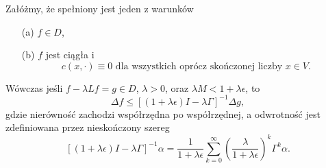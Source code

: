 \documentclass{article}
\begin{document}
	\begin{fak}\label{fak:4.2}
		Załóżmy, że spełniony jest jeden z warunków
		\begin{itemize}
    			\item[(a)] $f \in D$,
    			\item[(b)] $f$ jest ciągła i
				\begin{equation}\label{eq:4.3}
			c(x, \cdot) \equiv 0 
			\text{ dla wszystkich oprócz skończonej liczby } x \in V.
		\end{equation}
		\end{itemize}
	Wówczas jeśli $f - \lambda Lf = g \in D$, $\lambda > 0$, 
	oraz $\lambda M < 1 + \lambda \epsilon$, to
	\begin{equation}\label{eq:4.4}
		\Delta f \leq \left[ (1 + \lambda \epsilon)I - \lambda \Gamma \right]^{-1} \Delta g,
	\end{equation}
	gdzie nierówność zachodzi współrzędna po współrzędnej, a odwrotność 
	jest zdefiniowana przez nieskończony szereg
	\begin{equation}\label{eq:4.5}
		\left[ (1 + \lambda \epsilon)I - \lambda \Gamma \right]^{-1} \alpha 
		= \frac{1}{1 + \lambda \epsilon} \sum_{k=0}^{\infty} 
		\left( \frac{\lambda}{1 + \lambda \epsilon} \right)^k \Gamma^k \alpha.
	\end{equation}
\end{fak}
\end{document}
